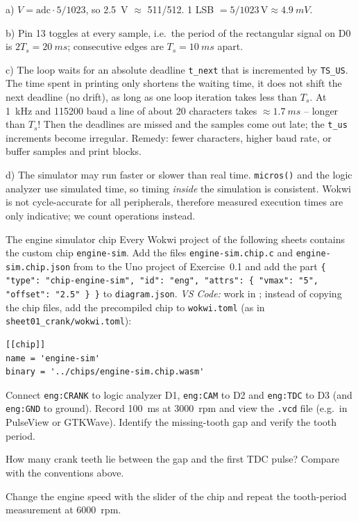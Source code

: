\begin{solution}
a) $V = \text{adc}\cdot 5/1023$, so \SI{2.5}{V} $\approx$ 511/512.
1 LSB $= 5/1023\,\text{V} \approx \SI{4.9}{mV}$.

b) Pin 13 toggles at every sample, i.e.\ the period of the rectangular signal on D0
is $2T_s = \SI{20}{ms}$; consecutive edges are $T_s=\SI{10}{ms}$ apart.

c) The loop waits for an absolute deadline \texttt{t\_next} that is incremented by
\texttt{TS\_US}. The time spent in printing only shortens the waiting time, it does
not shift the next deadline (no drift), as long as one loop iteration takes less
than $T_s$. At \SI{1}{kHz} and 115200 baud a line of about 20 characters takes
$\approx\SI{1.7}{ms}$ -- longer than $T_s$! Then the deadlines are missed and
the samples come out late; the \texttt{t\_us} increments become irregular. Remedy:
fewer characters, higher baud rate, or buffer samples and print blocks.

d) The simulator may run faster or slower than real time. \texttt{micros()} and
the logic analyzer use simulated time, so timing \emph{inside} the simulation is
consistent. Wokwi is not cycle-accurate for all peripherals, therefore measured
execution times are only indicative; we count operations instead.
\end{solution}

\begin{exercise}{The engine simulator chip}{\Wokwi}
Every Wokwi project of the following sheets contains the custom chip
\texttt{engine-sim}. Add the files \texttt{engine-sim.chip.c} and
\texttt{engine-sim.chip.json} from  to the Uno project of
Exercise~0.1 and add the part
\verb|{ "type": "chip-engine-sim", "id": "eng", "attrs": { "vmax": "5", "offset": "2.5" } }|
to \texttt{diagram.json}.
\emph{VS Code:} work in ; instead of
copying the chip files, add the precompiled chip to \texttt{wokwi.toml}
(as in \texttt{sheet01\_crank/wokwi.toml}):
\begin{lstlisting}
[[chip]]
name = 'engine-sim'
binary = '../chips/engine-sim.chip.wasm'
\end{lstlisting}
\begin{tasks}
  \item Connect \texttt{eng:CRANK} to logic analyzer D1, \texttt{eng:CAM} to D2
    and \texttt{eng:TDC} to D3 (and \texttt{eng:GND} to ground). Record
    \SI{100}{ms} at \SI{3000}{rpm} and view the \texttt{.vcd} file (e.g.\ in
    PulseView or GTKWave). Identify the missing-tooth gap and verify the
    tooth period.
  \item How many crank teeth lie between the gap and the first TDC pulse?
    Compare with the conventions above.
  \item Change the engine speed with the slider of the chip and repeat the
    tooth-period measurement at \SI{6000}{rpm}.
\end{tasks}
\end{exercise}

